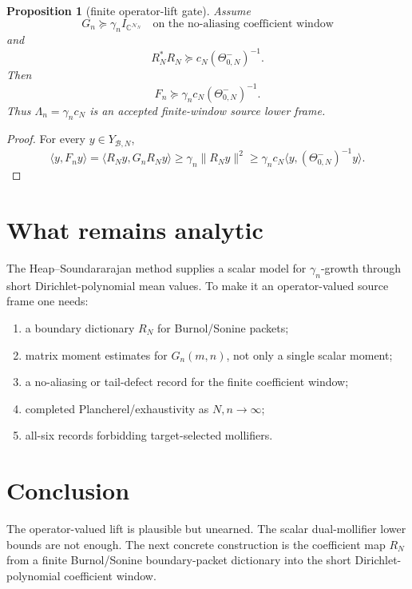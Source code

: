 \documentclass[11pt]{article}
\newtheorem{proposition}{Proposition}
\newcommand{\cB}{\mathcal B}
\newcommand{\cN}{\mathcal N}
\begin{document}
\begin{proposition}[finite operator-lift gate]
Assume
\[
        G_n\succeq \gamma_n I_{\mathbb C^{\cN_N}}
        \quad\text{on the no-aliasing coefficient window}
\]
and
\[
        R_N^*R_N\succeq c_N(\Theta_{0,N}^-)^{-1}.
\]
Then
\[
        F_n\succeq \gamma_n c_N(\Theta_{0,N}^-)^{-1}.
\]
Thus $\Lambda_n=\gamma_n c_N$ is an accepted finite-window source lower frame.
\end{proposition}

\begin{proof}
For every $y\in Y_{\cB,N}$,
\[
        \langle y,F_ny\rangle
        =\langle R_Ny,G_nR_Ny\rangle
        \ge \gamma_n\|R_Ny\|^2
        \ge \gamma_n c_N\langle y,(\Theta_{0,N}^-)^{-1}y\rangle.
\]
\end{proof}

\section{What remains analytic}
The Heap--Soundararajan method supplies a scalar model for $\gamma_n$-growth through short Dirichlet-polynomial mean values.  To make it an operator-valued source frame one needs:
\begin{enumerate}[label=(\alph*)]
\item a boundary dictionary $R_N$ for Burnol/Sonine packets;
\item matrix moment estimates for $G_n(m,n)$, not only a single scalar moment;
\item a no-aliasing or tail-defect record for the finite coefficient window;
\item completed Plancherel/exhaustivity as $N,n\to\infty$;
\item all-six records forbidding target-selected mollifiers.
\end{enumerate}

\section{Conclusion}
The operator-valued lift is plausible but unearned.  The scalar dual-mollifier lower bounds are not enough.  The next concrete construction is the coefficient map $R_N$ from a finite Burnol/Sonine boundary-packet dictionary into the short Dirichlet-polynomial coefficient window.
\end{document}
